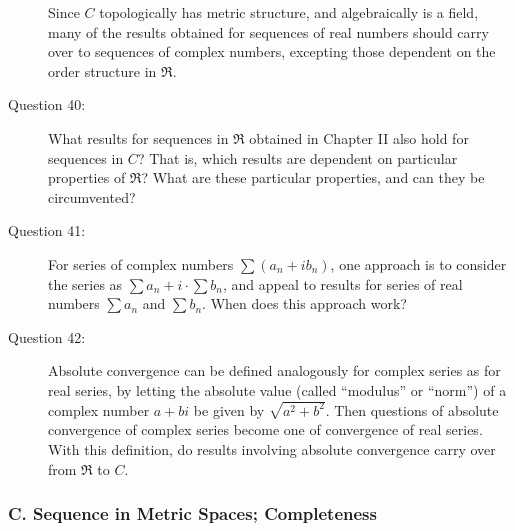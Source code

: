 \documentclass{article}
\begin{document}
\begin{description}

  \item[] Since $C$ topologically has metric structure, and algebraically is a field, many of the results obtained for sequences of real numbers should carry over to sequences of complex numbers, excepting those dependent on the order structure in $\Re$.

  \item[Question 40:] What results for sequences in $\Re$ obtained in Chapter II also hold for sequences in $C$? That is, which results are dependent on particular properties of $\Re$? What are these particular properties, and can they be circumvented?

  \item[Question 41:] For series of complex numbers $\sum (a_n + i b_n)$, one approach is to consider the series as $\sum a_n + i \cdot \sum b_n$, and appeal to results for series of real numbers $\sum a_n$ and $\sum b_n$. When does this approach work?

  \item[Question 42:] Absolute convergence can be defined analogously for complex series as for real series, by letting the absolute value (called ``modulus'' or ``norm'') of a complex number $a+bi$ be given by $\sqrt{a^2 + b^2}$. Then questions of absolute convergence of complex series become one of convergence of real series. With this definition, do results involving absolute convergence carry over from $\Re$ to $C$.

\end{description}


\subsubsection*{C. Sequence in Metric Spaces; Completeness}
\end{document}
